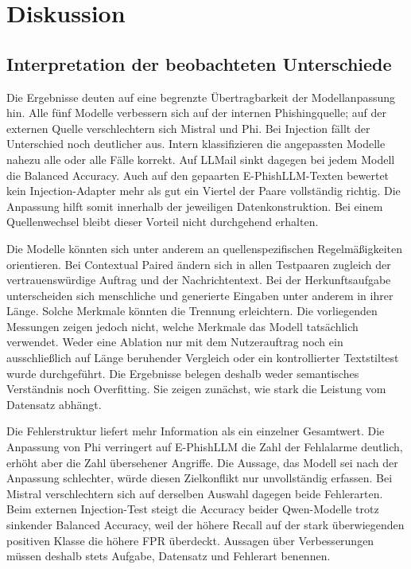 \documentclass[12pt,twoside=false,a4paper,parskip]{scrbook}
\begin{document}
\chapter{Diskussion}\label{ch:diskussion}

\section{Interpretation der beobachteten Unterschiede}\label{sec:interpretation}

Die Ergebnisse deuten auf eine begrenzte Übertragbarkeit der Modellanpassung hin. Alle fünf Modelle verbessern sich auf der internen Phishingquelle; auf der externen Quelle verschlechtern sich Mistral und Phi. Bei Injection fällt der Unterschied noch deutlicher aus. Intern klassifizieren die angepassten Modelle nahezu alle oder alle Fälle korrekt. Auf LLMail sinkt dagegen bei jedem Modell die Balanced Accuracy. Auch auf den gepaarten E-PhishLLM-Texten bewertet kein Injection-Adapter mehr als gut ein Viertel der Paare vollständig richtig. Die Anpassung hilft somit innerhalb der jeweiligen Datenkonstruktion. Bei einem Quellenwechsel bleibt dieser Vorteil nicht durchgehend erhalten.

Die Modelle könnten sich unter anderem an quellenspezifischen Regelmäßigkeiten orientieren. Bei Contextual Paired ändern sich in allen Testpaaren zugleich der vertrauenswürdige Auftrag und der Nachrichtentext. Bei der Herkunftsaufgabe unterscheiden sich menschliche und generierte Eingaben unter anderem in ihrer Länge. Solche Merkmale könnten die Trennung erleichtern. Die vorliegenden Messungen zeigen jedoch nicht, welche Merkmale das Modell tatsächlich verwendet. Weder eine Ablation nur mit dem Nutzerauftrag noch ein ausschließlich auf Länge beruhender Vergleich oder ein kontrollierter Textstiltest wurde durchgeführt. Die Ergebnisse belegen deshalb weder semantisches Verständnis noch Overfitting. Sie zeigen zunächst, wie stark die Leistung vom Datensatz abhängt.

Die Fehlerstruktur liefert mehr Information als ein einzelner Gesamtwert. Die Anpassung von Phi verringert auf E-PhishLLM die Zahl der Fehlalarme deutlich, erhöht aber die Zahl übersehener Angriffe. Die Aussage, das Modell sei nach der Anpassung schlechter, würde diesen Zielkonflikt nur unvollständig erfassen. Bei Mistral verschlechtern sich auf derselben Auswahl dagegen beide Fehlerarten. Beim externen Injection-Test steigt die Accuracy beider Qwen-Modelle trotz sinkender Balanced Accuracy, weil der höhere Recall auf der stark überwiegenden positiven Klasse die höhere FPR überdeckt. Aussagen über Verbesserungen müssen deshalb stets Aufgabe, Datensatz und Fehlerart benennen.
\end{document}
